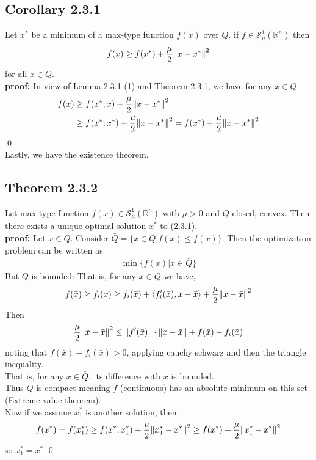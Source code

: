\documentclass[12pt,a4paper]{article}
\begin{document}
	 \subsection*{Corollary 2.3.1}\label{cor231}
	 Let $x^*$ be a minimum of a max-type function $f(x)$ over $Q$. if $f  \in \mathcal{S}_{\mu}^{1}(\mathbb{R}^n)$ then
	 \begin{align*}
	 	f(x) \geq f(x^*) + \frac{\mu}{2}\norm{x - x^*}^2
	 \end{align*}
	 for all $x \in Q$. \\
	 \textbf{proof:} In view of \hyperref[lem231]{Lemma 2.3.1 (1)} and \hyperref[thm231]{Theorem 2.3.1}, we have for any $x \in Q$
	 \begin{align*}
	 	f(x) &\geq f(x^*;x) + \frac{\mu}{2}\norm{x - x^*}^2 \\
	 	&\geq f(x^*;x^*) + \frac{\mu}{2}\norm{x - x^*}^2 = f(x^*) + \frac{\mu}{2}\norm{x - x^*}^2
	 \end{align*}
	 \qed \\
	 Lastly, we have the existence theorem.
	 \subsection*{Theorem 2.3.2}\label{thm232}
	 Let max-type function $f(x) \in \mathcal{S}_{\mu}^{1}(\mathbb{R}^n)$ with $\mu > 0$ and $Q$ closed, convex. Then there exists a unique optimal solution $x^*$ to \hyperref[minimax23]{(2.3.1)}. \\
	 \textbf{proof:} Let $\bar{x} \in Q$. Consider $\bar{Q} = \{ x \in Q | f(x) \leq f(\bar{x})\}$. Then the optimization problem can be written as
	 \begin{align*}
	 	\min \{f(x) |  x \in \bar{Q}\}
	 \end{align*}
	 But $\bar{Q}$ is bounded: That is, for any $x \in \bar{Q}$ we have,
	 \begin{align*}
	 	f(\bar{x}) \geq f_i(x) \geq f_i(\bar{x}) + \langle f_i'(\bar{x}), x - \bar{x} \rangle + \frac{\mu}{2}\norm{x - \bar{x}}^2
	 \end{align*}
	 Then
	 \begin{align*}
	 	\frac{\mu}{2}\norm{x - \bar{x}}^2 \leq \norm{f'(\bar{x})} \cdot \norm{x - \bar{x}} + f(\bar{x}) - f_i(\bar{x})
	 \end{align*}
	 noting that $f(\bar{x}) - f_i(\bar{x}) > 0$, applying cauchy schwarz and then the triangle inequality. \\
	 That is, for any $x \in \bar{Q}$, its difference with $\bar{x}$ is bounded. \\
	 Thus $\bar{Q}$ is compact meaning $f$ (continuous) has an absolute minimum on this set (Extreme value theorem). \\
	 Now if we assume $x_1^*$ is another solution, then:
	 \begin{align*}
	 	f(x^*) = f(x_1^*) \geq f(x^*;x_1^*) + \frac{\mu}{2}\norm{x_1^* - x^*}^2 \geq f(x^*) + \frac{\mu}{2}\norm{x_1^* - x^*}^2
	 \end{align*}
	 so $x_1^* = x^*$ \qed
	 
\end{document}
